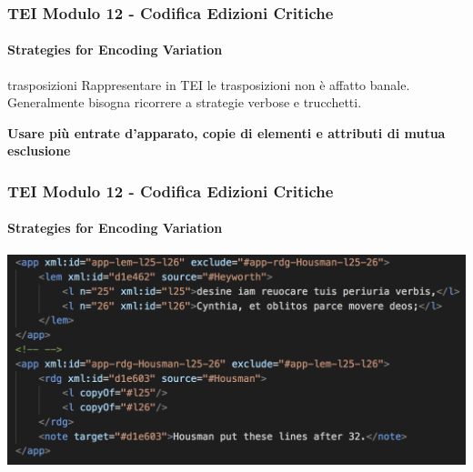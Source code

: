 \begin{frame}
    \frametitle{TEI Modulo 12 - Codifica Edizioni Critiche}
    \framesubtitle{Strategies for Encoding Variation}
    \addtocounter{nframe}{1}
    


    
    

    \begin{block}{trasposizioni}
       Rappresentare in TEI le trasposizioni non è affatto banale. Generalmente bisogna ricorrere a strategie verbose e trucchetti.
    \end{block}
    \textbf{Usare più entrate d'apparato, copie di elementi e attributi di mutua esclusione}

\end{frame}


\begin{frame}
    \frametitle{TEI Modulo 12 - Codifica Edizioni Critiche}
    \framesubtitle{Strategies for Encoding Variation}
    \addtocounter{nframe}{1}
    



    \begin{center}
       \includegraphics[width=.95\textwidth]{imgs/app-transposition.png}
    \end{center}

\end{frame}


